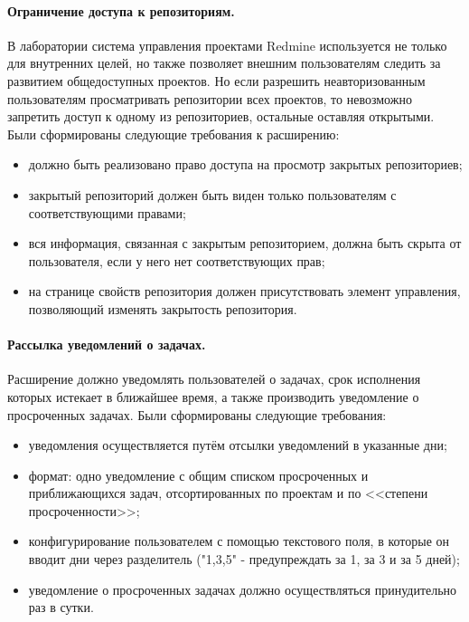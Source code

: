 \paragraph{Ограничение доступа к репозиториям.}
\label{definiton:private_repository}
В лаборатории система управления проектами Redmine используется не только для
внутренних целей, но также позволяет внешним пользователям следить за развитием
общедоступных проектов. Но если разрешить неавторизованным пользователям
просматривать репозитории всех проектов, то невозможно запретить доступ к
одному из репозиториев, остальные оставляя открытыми. Были сформированы
следующие требования к расширению:
\begin{itemize}
  \item должно быть реализовано право доступа на просмотр закрытых
  репозиториев;
  \item закрытый репозиторий должен быть виден только пользователям с
  соответствующими правами;  
  \item вся информация, связанная с закрытым репозиторием, должна быть скрыта
  от пользователя, если у него нет соответствующих прав;
  \item на странице свойств репозитория должен присутствовать элемент
  управления, позволяющий изменять закрытость репозитория.
\end{itemize}

\paragraph{Рассылка уведомлений о задачах.}
\label{definition:due_date_reminder}
Расширение должно уведомлять пользователей о задачах, срок исполнения которых
истекает в ближайшее время, а также производить уведомление о просроченных
задачах. Были сформированы следующие требования:
\begin{itemize}
  \item уведомления осуществляется путём отсылки уведомлений в указанные дни;
  \item формат: одно уведомление с общим списком просроченных и приближающихся
  задач, отсортированных по проектам и по <<степени просроченности>>; 
  \item конфигурирование пользователем с помощью текстового поля, в которые он
  вводит дни через разделитель ("1,3,5" - предупреждать за 1, за 3 и за 5
  дней);
  \item уведомление о просроченных задачах должно осуществляться принудительно
  раз в сутки.
\end{itemize}

